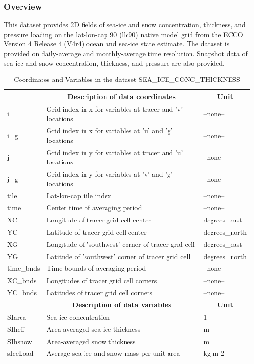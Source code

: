 \subsubsection{Overview}
This dataset provides 2D fields of sea-ice and snow concentration, thickness, and pressure loading on the lat-lon-cap 90 (llc90) native model grid from the ECCO Version 4 Release 4 (V4r4) ocean and sea-ice state estimate. The dataset is provided on daily-average and monthly-average time resolution. Snapshot data of sea-ice and snow concentration, thickness, and pressure are also provided. 
\begin{longtable}{|m{}|m{}|m{}|}
\caption{Coordinates and Variables in the dataset SEA\_ICE\_CONC\_THICKNESS}
\label{tab:table-SEA_ICE_CONC_THICKNESS-fields} \\ 
\hline \endhead \hline \endfoot
\rowcolor{lightgray} \multicolumn{1}{|c|}{\textbf{Coordinates}} & \multicolumn{1}{|c|}{\textbf{Description of data coordinates}} &  \multicolumn{1}{|c|}{\textbf{Unit}}\\ \hline
i &Grid index in x for variables at tracer and 'v' locations &--none--  \\ \hline
i\_g &Grid index in x for variables at 'u' and 'g' locations &--none--  \\ \hline
j &Grid index in y for variables at tracer and 'u' locations &--none--  \\ \hline
j\_g &Grid index in y for variables at 'v' and 'g' locations &--none--  \\ \hline
tile &Lat-lon-cap tile index &--none--  \\ \hline
time &Center time of averaging period &--none--  \\ \hline
XC &Longitude of tracer grid cell center &degrees\_east  \\ \hline
YC &Latitude of tracer grid cell center &degrees\_north  \\ \hline
XG &Longitude of 'southwest' corner of tracer grid cell &degrees\_east  \\ \hline
YG &Latitude of 'southwest' corner of tracer grid cell &degrees\_north  \\ \hline
time\_bnds &Time bounds of averaging period &--none--  \\ \hline
XC\_bnds &Longitudes of tracer grid cell corners &--none--  \\ \hline
YC\_bnds &Latitudes of tracer grid cell corners &--none--  \\ \hline
\rowcolor{lightgray} \multicolumn{1}{|c|}{\textbf{Variables}} & \multicolumn{1}{|c|}{\textbf{Description of data variables}} &  \multicolumn{1}{|c|}{\textbf{Unit}}\\ \hline
SIarea &Sea-ice concentration &1  \\ \hline
SIheff &Area-averaged sea-ice thickness &m  \\ \hline
SIhsnow &Area-averaged snow thickness &m  \\ \hline
sIceLoad &Average sea-ice and snow mass per unit area &kg m-2  \\ \hline
\end{longtable}

